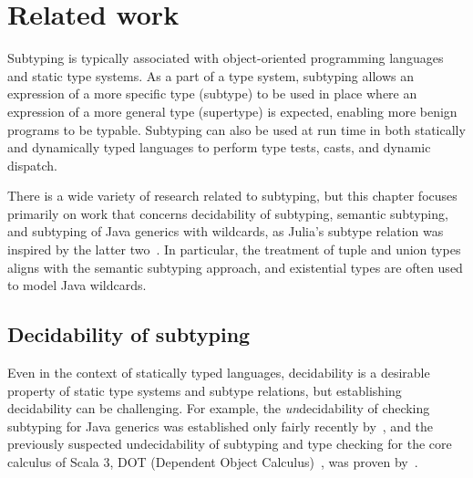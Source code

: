 \chapter{Related work}\label{chap:5}

Subtyping is typically associated with object-oriented programming languages and
static type systems. As a part of a type system, subtyping allows
an expression of a more specific type (subtype) to be used in place
where an expression of a more general type (supertype) is expected,
enabling more benign programs to be typable.
Subtyping can also be used at run time
in both statically and dynamically typed languages to perform
type tests, casts, and dynamic dispatch.

There is a wide variety of research related to subtyping, but this chapter
focuses primarily on work that concerns decidability of subtyping,
semantic subtyping, and subtyping of Java generics with wildcards,
as Julia's subtype relation was inspired by the latter
two~\cite{bezanson:julia:2015}.
In particular, the treatment of tuple and union types aligns with the semantic
subtyping approach, and existential types are often used to model Java
wildcards. 


\section{Decidability of subtyping}

Even in the context of statically typed languages,
decidability is a desirable property of static type systems and
subtype relations, but establishing decidability can be challenging.
For example, the \emph{un}decidability of checking subtyping for Java generics
was established only fairly recently by~\citet{grigore:java-undec:2017},
and the previously suspected undecidability of subtyping and type checking for
the core calculus of Scala 3,
DOT (Dependent Object Calculus)~\cite{amin:dot:2016},
was proven by~\citet{hu:dot-undec:2020}.

